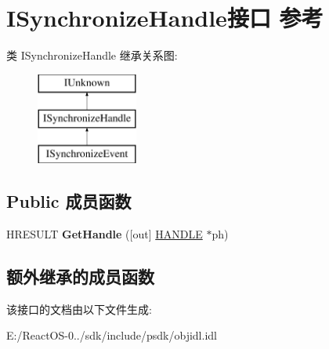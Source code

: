 \hypertarget{interface_i_synchronize_handle}{}\section{I\+Synchronize\+Handle接口 参考}
\label{interface_i_synchronize_handle}
类 I\+Synchronize\+Handle 继承关系图\+:\begin{figure}[H]
\begin{center}
\leavevmode
\includegraphics[height=3.000000cm]{interface_i_synchronize_handle}
\end{center}
\end{figure}
\subsection*{Public 成员函数}
\begin{DoxyCompactItemize}
\item 
\mbox{\label{interface_i_synchronize_handle_abf74717853426015a57ecedc15e5768e}} 
H\+R\+E\+S\+U\+LT {\bfseries Get\+Handle} (\mbox{[}out\mbox{]} \hyperlink{interfacevoid}{H\+A\+N\+D\+LE} $\ast$ph)
\end{DoxyCompactItemize}
\subsection*{额外继承的成员函数}


该接口的文档由以下文件生成\+:\begin{DoxyCompactItemize}
\item 
E\+:/\+React\+O\+S-\/0../sdk/include/psdk/objidl.\+idl\end{DoxyCompactItemize}
